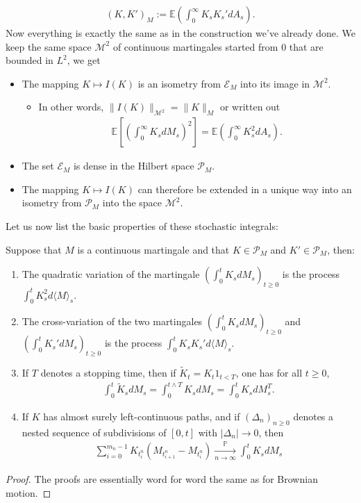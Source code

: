 \documentclass[../mainfile.tex]{subfiles}
\begin{document}
\begin{align*}
(K,K')_M:= \mathbb{E} \left( \int_0^\infty K_sK_s' dA_s \right).
\end{align*}
\newpage
Now everything is exactly the same as in the construction we've already done. We keep the same space $\mathcal{M}^2$ of continuous martingales started from $0$ that are bounded in $L^2$, we get
\begin{itemize}
\item The mapping $K \mapsto I(K)$ is an isometry from $\mathcal{E}_M$ into its image in $\mathcal{M}^2.$
\begin{itemize}
\item In other words, $\|I(K)\|_{\mathcal{M}^2} = \|K\|_M$ or written out 
\begin{align*}
\mathbb{E}\left[ \left( \int_0^\infty K_s d M_s \right)^2 \right] = \mathbb{E}\left( \int_0^\infty K_s^2 dA_s \right). 
\end{align*}
\end{itemize}
\item The set $\mathcal{E}_M$ is dense in the Hilbert space $\mathcal{P}_M$. 
\item The mapping $K \mapsto I(K)$ can therefore be extended in a unique way into an isometry from $\mathcal{P}_M$ into the space $\mathcal{M}^2$.  
\end{itemize}
Let us now list the basic properties of these stochastic integrals:
\begin{prop} Suppose that $M$ is a continuous martingale and that $K \in \mathcal{P}_M$ and $K' \in \mathcal{P}_M$, then: \begin{enumerate}
\item The quadratic variation of the martingale $( \int_0^t K_s dM_s)_{t \geq 0}$ is the process $\int_0^t K_s^2 d \langle M \rangle_s.$
\item The cross-variation of the two martingales $( \int_0^t K_s dM_s)_{t \geq 0}$ and $(\int_0^t K_s' dM_s)_{t \geq 0}$ is the process $\int_0^t K_s K_s' d\langle M \rangle_s.$ 
\item If $T$ denotes a stopping time, then if $\tilde{K}_t = K_t 1 _{t < T}$, one has for all $t\geq 0$,
\begin{align*}
\int_0^t \tilde{K}_s dM_s = \int_0^{t \wedge T} K_s dM_s = \int_0^t K_s dM_s^T. 
\end{align*}
\item If $K$ has almost surely left-continuous paths, and if $( \Delta_n)_{n \geq 0}$ denotes a nested sequence of subdivisions of $[0,t]$ with $|\Delta_n| \to 0$, then 
\begin{align*}
\sum_{i=0}^{m_n-1} K_{t_i^n} (M_{t_{i+1}^n}-M_{t_i^n}) \xrightarrow[n \to \infty]{ \mathbb{P}} \int_0^t K_s dM_s
\end{align*}
\end{enumerate}
\end{prop}
\begin{proof}
The proofs are essentially word for word the same as for Brownian motion. 
\end{proof}
\newpage
\end{document}
